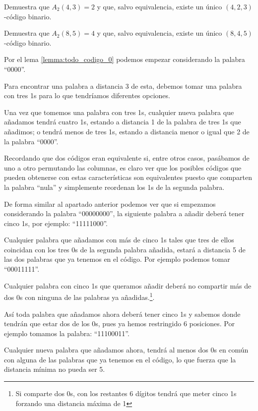 \begin{problem}[3]
\ppart Demuestra que $A_2(4,3)=2$ y que, salvo equivalencia, existe un único $(4,2,3)$-código binario.

\ppart Demuestra que $A_2(8,5)=4$ y que, salvo equivalencia, existe un único $(8,4,5)$-código binario.
\solution


\spart
Por el lema \ref{lemma:todo_codigo_0} podemos empezar considerando la palabra ``0000''.

Para encontrar una palabra a distancia 3 de esta, debemos tomar una palabra con tres 1s para lo que tendríamos diferentes opciones.

Una vez que tomemos una palabra con tres 1s, cualquier nueva palabra que añadamos tendrá cuatro 1s, estando a distancia 1 de la palabra de tres 1s que añadimos; o tendrá menos de tres 1s, estando a distancia menor o igual que 2 de la palabra ``0000''.

Recordando que dos códigos eran equivalente si, entre otros casos, pasábamos de uno a otro permutando las columnas, es claro ver que los posibles códigos que pueden obtenerse con estas características son equivalentes puesto que comparten la palabra ``nula'' y simplemente reordenan los 1s de la segunda palabra.

\spart

De forma similar al apartado anterior podemos ver que si empezamos considerando la palabra ``00000000'', la siguiente palabra a añadir deberá tener cinco 1s, por ejemplo: ``11111000''.

Cualquier palabra que añadamos con más de cinco 1s tales que tres de ellos coincidan con los tres 0s de la segunda palabra añadida, estará a distancia 5 de las dos palabras que ya tenemos en el código. Por ejemplo podemos tomar ``00011111''.

Cualquier palabra con cinco 1s que queramos añadir deberá no compartir más de dos 0s con ninguna de las palabras ya añadidas.\footnote{Si comparte dos 0s, con los restantes 6 dígitos tendrá que meter cinco 1s forzando una distancia máxima de 1}.

Así toda palabra que añadamos ahora deberá tener cinco 1s y sabemos donde tendrán que estar dos de los 0s, pues ya hemos restringido 6 posiciones. Por ejemplo tomamos la palabra: ``11100011''.

Cualquier nueva palabra que añadamos ahora, tendrá al menos dos 0s en común con alguna de las palabras que ya tenemos en el código, lo que fuerza que la distancia mínima no pueda ser 5.


\end{problem}


